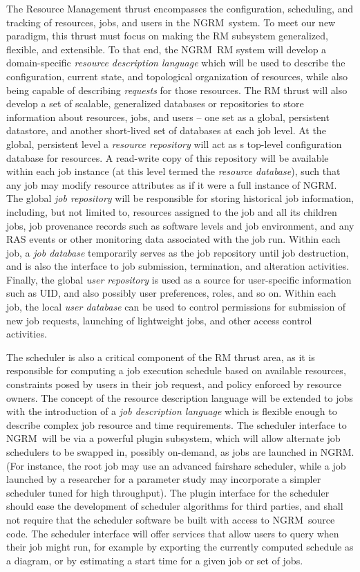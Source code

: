 \documentclass[10pt]{article}
\newcommand{\ngrm}{NGRM}
\begin{document}
The Resource Management thrust encompasses the configuration,
scheduling, and tracking of resources, jobs, and users in the \ngrm\
system. To meet our new paradigm, this thrust must focus on making
the RM subsystem generalized, flexible, and extensible. To that
end, the \ngrm\ RM system will develop a domain-specific {\em
resource description language} which will be used to describe
the configuration, current state, and topological organization of
resources, while also being capable of describing {\em requests} for
those resources.  The RM thrust will also develop a set of scalable,
generalized databases or repositories to store information about
resources, jobs, and users -- one set as a global, persistent
datastore, and another short-lived set of databases at each job
level. At the global, persistent level a {\em resource repository}
will act as s top-level configuration database for resources. A
read-write copy of this repository will be available within each
job instance (at this level termed the {\em resource database}),
such that any job may modify resource attributes as if it were a
full instance of \ngrm. The global {\em job repository} will be
responsible for storing historical job information, including,
but not limited to, resources assigned to the job and all its
children jobs, job provenance records such as software levels
and job environment, and any RAS events or other monitoring data
associated with the job run. Within each job, a {\em job database}
temporarily serves as the job repository until job destruction,
and is also the interface to job submission, termination, and
alteration activities.  Finally, the global {\em user repository}
is used as a source for user-specific information such as UID, and
also possibly user preferences, roles, and so on. Within each job,
the local {\em user database} can be used to control permissions
for submission of new job requests, launching of lightweight jobs,
and other access control activities.

The scheduler is also a critical component of the RM thrust area,
as it is responsible for computing a job execution schedule based
on available resources, constraints posed by users in their job
request, and policy enforced by resource owners. The concept of
the resource description language will be extended to jobs with the
introduction of a {\em job description language} which is flexible
enough to describe complex job resource and time requirements. The
scheduler interface to \ngrm\ will be via a powerful plugin
subsystem, which will allow alternate job schedulers to be swapped
in, possibly on-demand, as jobs are launched in \ngrm. (For
instance, the root job may use an advanced fairshare scheduler,
while a job launched by a researcher for a parameter study may
incorporate a simpler scheduler tuned for high throughput). The
plugin interface for the scheduler should ease the development of
scheduler algorithms for third parties, and shall not require that
the scheduler software be built with access to \ngrm\ source code.
The scheduler interface will offer services that allow users
to query when their job might run, for example by exporting
the currently computed schedule as a diagram, or by estimating
a start time for a given job or set of jobs.
\end{document}
